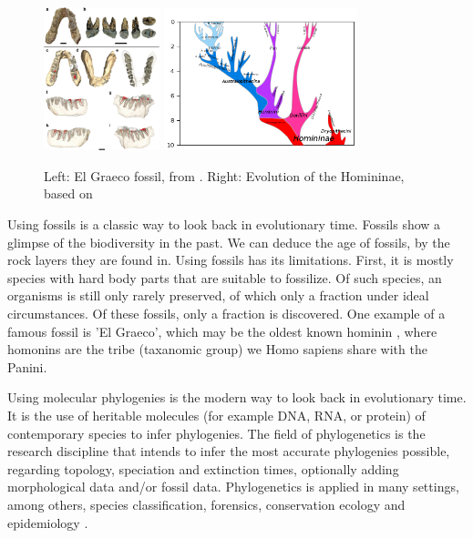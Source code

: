 \begin{figure}[H]
  \includegraphics[width=0.3\textwidth]{Graecopithecus.jpg}
  \includegraphics[width=0.5\textwidth]{Hominini_lineage.png}
  \caption{
    Left: El Graeco fossil, from \cite{fuss2017potential}.
    Right: Evolution of the Homininae, based on \cite{stringer2012makes}
 }
  \label{fig:human_evolution}
\end{figure}

Using fossils is a classic way to look back in evolutionary time.
Fossils show a glimpse of the biodiversity in the past.
We can deduce the age of fossils, by the rock layers they are found in.
Using fossils has its limitations. First, it is mostly species with hard body
parts that are suitable to fossilize. Of such species, an organisms is still 
only rarely preserved, of which only a fraction under ideal circumstances. Of 
these fossils, only a fraction is discovered.
One example of a famous fossil is 'El Graeco', 
which may be the oldest known hominin \cite{fuss2017potential}, where
homonins are the tribe (taxanomic group) we Homo sapiens share with the Panini.

Using molecular phylogenies is the modern way to look back in evolutionary time.
It is the use of heritable molecules (for example DNA, RNA, or protein)  
of contemporary species to infer phylogenies. 
The field of phylogenetics is the research discipline that
intends to infer the most accurate phylogenies possible, 
regarding topology, speciation and extinction times,
optionally adding morphological data and/or fossil data.
Phylogenetics is applied in many settings, among
others, species classification,
forensics, conservation ecology
and epidemiology \cite{lam2010use}.


